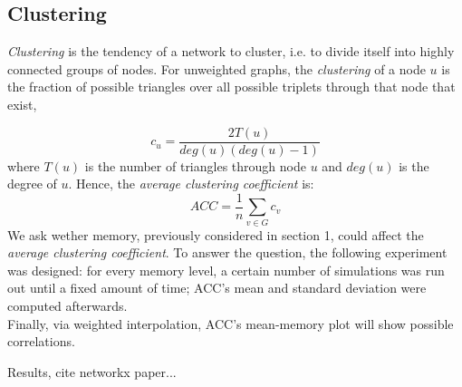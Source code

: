 \subsection{Clustering}
\textit{Clustering} is the tendency of a network to cluster, i.e. to divide itself into highly connected groups of nodes.
For unweighted graphs, the \textit{clustering} of a node $u$ is the fraction of possible triangles over all possible triplets  through that node that exist,

$$
c_u = \frac{2 T(u)}{deg(u)(deg(u)-1)}
$$
where $T(u)$ is the number of triangles through node $u$ and $deg(u)$ is the degree of $u$.
Hence, the \textit{average clustering coefficient}  is:
$$
ACC = \frac{1}{n}\sum_{v \in G} c_v
$$
We ask wether memory, previously considered in section 1, could affect the \textit{average clustering coefficient}.
To answer the question, the following experiment was designed:
for every memory level, a certain number of simulations was run out until a fixed amount of time; ACC's mean and standard deviation were computed afterwards.\\
Finally, via weighted interpolation,  ACC's mean-memory plot will show possible correlations. 

Results, cite networkx paper...